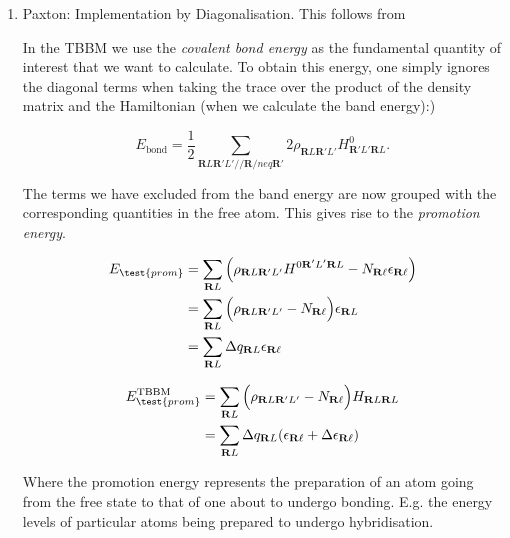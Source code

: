 \documentclass[11pt]{article}
\begin{document}
\begin{enumerate}
\item Paxton: Implementation by Diagonalisation.
\label{sec-1-1-2-1}
This follows from \cite{Paxton:153084}

In the TBBM we use the \emph{covalent bond energy} as the fundamental quantity of interest that we want to calculate.
To obtain this energy, one simply ignores the diagonal terms when taking the trace over the product of the density matrix and
the Hamiltonian (when we calculate the band energy):)

\begin{export}
\[ 
E_{\text{bond}} = \frac{1}{2} \sum_{\mathbf{R}L\mathbf{R}'L'//\mathbf{R}/neq\mathbf{R}'}
                             2\rho_{\mathbf{R}L\mathbf{R}'L'} H^{0}_{\mathbf{R}'L'\mathbf{R}L}.
\]
\end{export}


The terms we have excluded from the band energy are now grouped with the corresponding quantities in the free atom. 
This gives rise to the \emph{promotion energy}.

\begin{export}
\begin{align}
E_{\test{prom}} &= \sum_{\mathbf{R}L} \Big(\rho_{\mathbf{R}L\mathbf{R}'L'}H^{0\mathbf{R}'L'\mathbf{R}L} - N_{\mathbf{R}\ell}\epsilon_{\mathbf{R}\ell} \Big)\\
              &= \sum_{\mathbf{R}L} \Big(\rho_{\mathbf{R}L\mathbf{R}'L'} - N_{\mathbf{R}\ell} \Big) \epsilon_{\mathbf{R}L}\\
              &= \sum_{\mathbf{R}L} \Delta q_{\mathbf{R}L} \epsilon_{\mathbf{R}\ell}
\end{align}
\end{export}

\begin{export}
\begin{align}
E_{\test{prom}}^{\text{TBBM}} &= \sum_{\mathbf{R}L} \Big(\rho_{\mathbf{R}L\mathbf{R}'L'} - N_{\mathbf{R}\ell} \Big) H_{\mathbf{R}L\mathbf{R}L}\\
              &= \sum_{\mathbf{R}L} \Delta q_{\mathbf{R}L}( \epsilon_{\mathbf{R}\ell} + \Delta \epsilon_{\mathbf{R}\ell} )
\end{align}
\end{export}

Where the promotion energy represents the preparation of an atom going from the free state to that of one about to undergo bonding. 
E.g. the energy levels of particular atoms being prepared to undergo hybridisation.



\end{enumerate}
\end{document}
